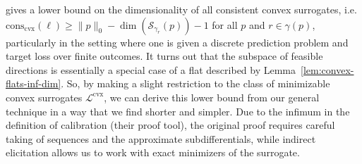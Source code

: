 \documentclass[anon,12pt]{colt2021} %
\newcommand{\Comments}{1}
\newcommand{\mynote}[2]{\ifnum\Comments=1\textcolor{#1}{#2}\fi}
\newcommand{\jessie}[1]{\mynote{purple}{[JF: #1]}}
\newcommand{\reals}{\mathbb{R}}
\newcommand{\conscvx}{\mathrm{cons}_\mathrm{cvx}}
\newcommand{\rank}{\mathrm{rank}}
\newcommand{\zeros}[1]{\mathrm{ker}_\P\,#1}
\newcommand{\codim}{\mathrm{codim}}
\newcommand{\Pcodim}{\mathcal{P}\!\text{-}\mathrm{codim}}
\newcommand{\E}{\mathbb{E}}
\newcommand{\Lcvx}{\mathcal{L}^{\mathrm{cvx}}}
\newcommand{\R}{\mathcal{R}}
\renewcommand{\P}{\mathcal{P}}
\newcommand{\Sc}{\mathcal{S}}  %
\newcommand{\Y}{\mathcal{Y}}
\newcommand{\toto}{\rightrightarrows}
\begin{document}
\citet{ramaswamy2016convex} gives a lower bound on the dimensionality of all consistent convex surrogates, i.e. $\conscvx(\ell) \geq \|p\|_0 - \dim(\Sc_{\gamma_r}(p)) - 1$ for all $p$ and $r \in \gamma(p)$, particularly in the setting where one is given a discrete prediction problem and target loss over finite outcomes.
It turns out that the subspace of feasible directions is essentially a special case of a flat described by Lemma~\ref{lem:convex-flats-inf-dim}.
So, by making a slight restriction to the class of minimizable convex surrogates $\Lcvx$, we can derive this lower bound from our general technique in a way that we find shorter and simpler.
Due to the infimum in the definition of calibration (their proof tool), the original proof requires careful taking of sequences and the approximate subdifferentials, while indirect elicitation allows us to work with exact minimizers of the surrogate.

%	
\end{document}

